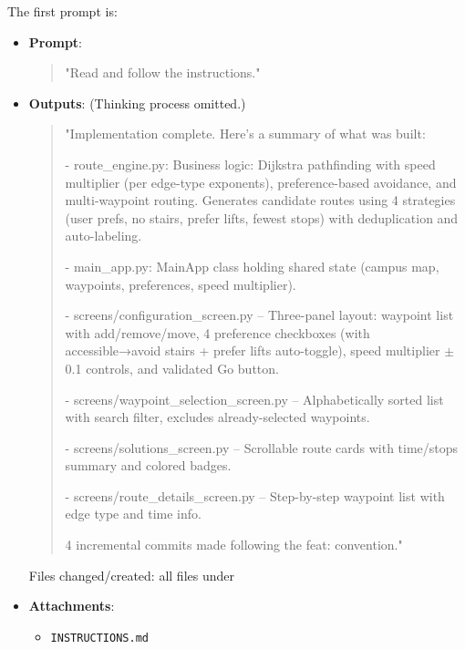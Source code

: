 \documentclass[a4paper,10pt]{amsart}
\begin{document}
The first prompt is:
\begin{itemize}
    \item \textbf{Prompt}:
    \begin{quotation}
        \ttfamily "Read and follow the instructions."
    \end{quotation}
    \item \textbf{Outputs}:
    (Thinking process omitted.)
    \begin{quotation}
        \ttfamily "Implementation complete. Here's a summary of what was built:
        
        - route\_engine.py: Business logic: Dijkstra pathfinding with speed multiplier (per edge-type exponents), preference-based avoidance, and multi-waypoint routing.
        Generates candidate routes using 4 strategies (user prefs, no stairs, prefer lifts, fewest stops) with deduplication and auto-labeling.

        - main\_app.py: MainApp class holding shared state (campus map, waypoints, preferences, speed multiplier).

        - screens/configuration\_screen.py – Three-panel layout: waypoint list with add/remove/move, 4 preference checkboxes (with accessible→avoid stairs + prefer lifts auto-toggle), speed multiplier $\pm$0.1 controls, and validated Go button.

        - screens/waypoint\_selection\_screen.py – Alphabetically sorted list with search filter, excludes already-selected waypoints.

        - screens/solutions\_screen.py – Scrollable route cards with time/stops summary and colored badges.

        - screens/route\_details\_screen.py – Step-by-step waypoint list with edge type and time info.

        4 incremental commits made following the feat: convention."
    \end{quotation}
    Files changed/created: all files under 
    \item \textbf{Attachments}:
    \begin{itemize}
        \item \texttt{INSTRUCTIONS.md}
        
        
    \end{itemize}
\end{itemize}
\end{document}
